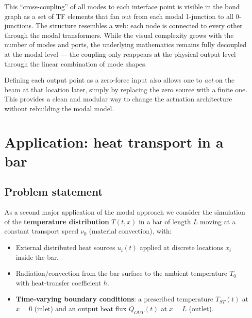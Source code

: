 This ``cross-coupling'' of all modes to each interface point is visible in the
bond graph as a set of TF elements that fan out from each modal 1-junction to
all 0-junctions.  The structure resembles a web: each node is connected to
every other through the modal transformers.  While the visual complexity grows
with the number of modes and ports, the underlying mathematics remains fully
decoupled at the modal level --- the coupling only reappears at the physical
output level through the linear combination of mode shapes.

\begin{insightbox}
  Defining each output point as a zero-force input also allows one to
  \emph{act} on the beam at that location later, simply by replacing the
  zero source with a finite one.  This provides a clean and modular way to
  change the actuation architecture without rebuilding the modal model.
\end{insightbox}


\section{Application: heat transport in a bar}
\label{sec:heat}

\subsection{Problem statement}
\label{ssec:heat_problem}

As a second major application of the modal approach we consider the simulation
of the \textbf{temperature distribution} $T(t,x)$ in a bar of length $L$ moving
at a constant transport speed $\nu_{0}$ (material convection), with:
\begin{itemize}[leftmargin=2em,itemsep=2pt]
  \item External distributed heat sources $u_{i}(t)$ applied at
    discrete locations $x_{i}$ inside the bar.
  \item Radiation/convection from the bar surface to the ambient temperature
    $T_{0}$ with heat-transfer coefficient $h$.
  \item \textbf{Time-varying boundary conditions}: a prescribed temperature
    $T_{ST}(t)$ at $x=0$ (inlet) and an output heat flux $Q_{OUT}(t)$ at
    $x=L$ (outlet).
\end{itemize}

